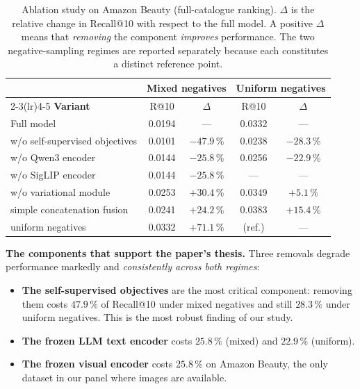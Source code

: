 \begin{table}[t]
\centering
\caption{Ablation study on Amazon Beauty (full-catalogue ranking). $\Delta$ is
the relative change in Recall@10 with respect to the full model. A positive
$\Delta$ means that \emph{removing} the component \emph{improves} performance.
The two negative-sampling regimes are reported separately because each
constitutes a distinct reference point.}
\label{tab:ablation}
\small
\begin{tabular}{lcccc}
\toprule
& \multicolumn{2}{c}{\textbf{Mixed negatives}} & \multicolumn{2}{c}{\textbf{Uniform negatives}} \\
\cmidrule(lr){2-3}\cmidrule(lr){4-5}
\textbf{Variant} & R@10 & $\Delta$ & R@10 & $\Delta$ \\
\midrule
Full model                  & 0.0194 & ---           & 0.0332 & --- \\
\midrule
w/o self-supervised objectives & 0.0101 & $-47.9\,\%$ & 0.0238 & $-28.3\,\%$ \\
w/o Qwen3 encoder           & 0.0144 & $-25.8\,\%$   & 0.0256 & $-22.9\,\%$ \\
w/o SigLIP encoder          & 0.0144 & $-25.8\,\%$   & ---    & --- \\
\midrule
w/o variational module      & 0.0253 & $+30.4\,\%$   & 0.0349 & $+5.1\,\%$ \\
simple concatenation fusion & 0.0241 & $+24.2\,\%$   & 0.0383 & $+15.4\,\%$ \\
uniform negatives           & 0.0332 & $+71.1\,\%$   & (ref.) & --- \\
\bottomrule
\end{tabular}
\end{table}

\textbf{The components that support the paper's thesis.} Three removals degrade
performance markedly and \emph{consistently across both regimes}:

\begin{itemize}
\item \textbf{The self-supervised objectives} are the most critical component:
  removing them costs $47.9\,\%$ of Recall@10 under mixed negatives and still
  $28.3\,\%$ under uniform negatives. This is the most robust finding of our
  study.
\item \textbf{The frozen LLM text encoder} costs $25.8\,\%$ (mixed) and
  $22.9\,\%$ (uniform).
\item \textbf{The frozen visual encoder} costs $25.8\,\%$ on Amazon Beauty, the
  only dataset in our panel where images are available.
\end{itemize}

